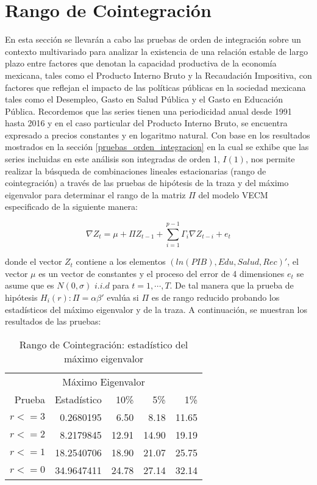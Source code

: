 

\section{Rango de Cointegración}\label{chap:rank}


En esta sección se llevarán a cabo las pruebas de orden de integración sobre un contexto multivariado para analizar la existencia de una relación estable de largo plazo entre factores que denotan la capacidad productiva de la economía mexicana, tales como el Producto Interno Bruto y la Recaudación Impositiva, con factores que reflejan el impacto de las políticas públicas en la sociedad mexicana tales como el Desempleo, Gasto en Salud Pública y el Gasto en Educación Pública. Recordemos que las series tienen una periodicidad anual desde 1991 hasta 2016 y en el caso particular del Producto Interno Bruto, se encuentra expresado a precios constantes y en logaritmo natural. Con base en los resultados mostrados en la sección \ref{pruebas_orden_integracion} en la cual se exhibe que las series incluidas en este análisis son integradas de orden 1, $I(1)$, nos permite realizar la búsqueda de combinaciones lineales estacionarias (rango de cointegración) a través de las pruebas de hipótesis de la traza y del máximo eigenvalor para determinar el rango de la matriz $\Pi$ del modelo VECM especificado de la siguiente manera:


\begin{equation} 
	\nabla Z_t=  \mu +   \Pi{Z}_{t-1} + \sum_{i=1}^{p-1}\Gamma_i\nabla Z_{t-i} +  e_t
\end{equation}

donde el vector $Z_t$ contiene a los elementos $(ln(PIB), Edu, Salud, Rec)'$, el vector $\mu$ es un vector de constantes y el proceso del error de 4 dimensiones $e_t$ se asume que es $N(0,\sigma)$ $i.i.d$ para $t = 1, \cdots, T$. De tal manera que la prueba de hipótesis $H_i (r) : \Pi=\alpha\beta'$ evalúa si $\Pi$ es de rango reducido probando los estadísticos del máximo eigenvalor y de la traza. A continuación, se muestran los resultados de las pruebas: \bigskip


\begin{table}[H]
\begin{center}
    \begin{tabular}{rrrrr}
    \hline
    \multicolumn{5}{c}{Máximo Eigenvalor} \\
        \cline{1-5}
        Prueba    		& Estadístico 		& 10\% 		& 5\% 		& 1\% \\
        \hline
        $r <= 3$		& 0.2680195		& 6.50		& 8.18		& 11.65    \\
        $r <= 2$		& 8.2179845		& 12.91		& 14.90		& 19.19    \\
        $r <= 1$		& 18.2540706		& 18.90		& 21.07		& 25.75   \\
        $r <= 0$		& 34.9647411		& 24.78		& 27.14		& 32.14   \\
        \hline
    \end{tabular}
\end{center}
\caption {Rango de Cointegración: estadístico del máximo eigenvalor} \label{tab:eigen} 
\end{table}


